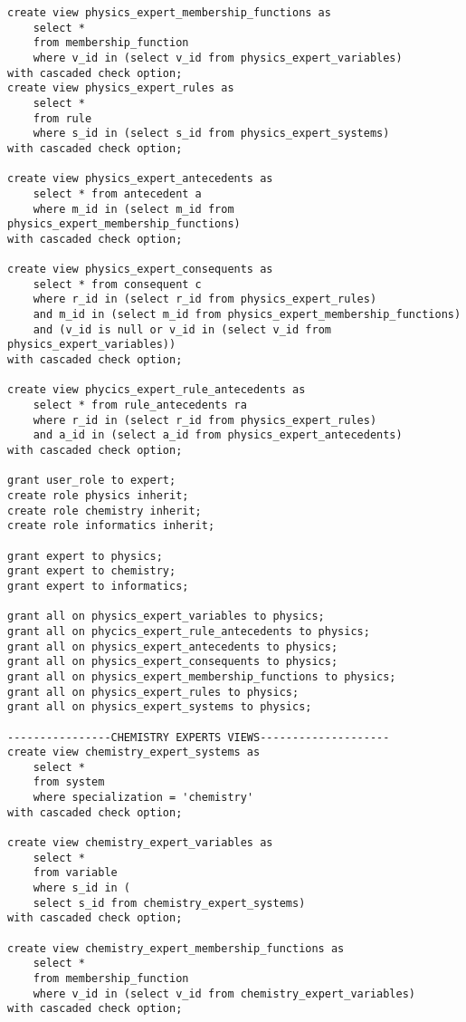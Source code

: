 \begin{lstlisting}[caption=Создание ролей на уровне базы данных (часть 2)]
create view physics_expert_membership_functions as
	select * 
	from membership_function
	where v_id in (select v_id from physics_expert_variables)
with cascaded check option;
create view physics_expert_rules as
	select *
	from rule
	where s_id in (select s_id from physics_expert_systems)
with cascaded check option;

create view physics_expert_antecedents as
	select * from antecedent a 
	where m_id in (select m_id from physics_expert_membership_functions)
with cascaded check option;

create view physics_expert_consequents as
	select * from consequent c 
	where r_id in (select r_id from physics_expert_rules) 
	and m_id in (select m_id from physics_expert_membership_functions)
	and (v_id is null or v_id in (select v_id from physics_expert_variables))
with cascaded check option;

create view phycics_expert_rule_antecedents as
	select * from rule_antecedents ra 
	where r_id in (select r_id from physics_expert_rules)
	and a_id in (select a_id from physics_expert_antecedents)
with cascaded check option;

grant user_role to expert; 
create role physics inherit;
create role chemistry inherit;
create role informatics inherit;

grant expert to physics;
grant expert to chemistry;
grant expert to informatics;

grant all on physics_expert_variables to physics;
grant all on phycics_expert_rule_antecedents to physics;
grant all on physics_expert_antecedents to physics;
grant all on physics_expert_consequents to physics;
grant all on physics_expert_membership_functions to physics;
grant all on physics_expert_rules to physics;
grant all on physics_expert_systems to physics;

----------------CHEMISTRY EXPERTS VIEWS--------------------
create view chemistry_expert_systems as 
	select * 
	from system 
	where specialization = 'chemistry' 
with cascaded check option;

create view chemistry_expert_variables as 
	select * 
	from variable 
	where s_id in (
	select s_id from chemistry_expert_systems)
with cascaded check option;

create view chemistry_expert_membership_functions as
	select * 
	from membership_function
	where v_id in (select v_id from chemistry_expert_variables)
with cascaded check option;


\end{lstlisting}
